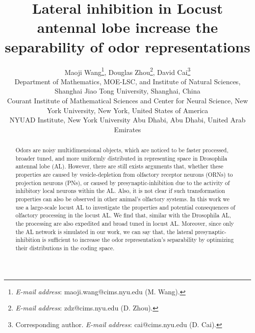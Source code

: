 \documentclass[12pt, a4paper]{article}
\begin{document}
\newcommand{\lr}[1]{\langle #1 \rangle}
\newcommand{\llr}[1]{\langle \hspace{-2.5pt} \langle #1 \rangle \hspace{-2.5pt} \rangle}

\title{Lateral inhibition in Locust antennal lobe increase the separability of odor representations}
\author{ \small %
  Maoji Wang\footnote{\emph{E-mail address}: maoji.wang@cims.nyu.edu (M. Wang).},
  Douglas Zhou\footnote{\emph{E-mail address}: zdz@cims.nyu.edu (D. Zhou).},
  David Cai\footnote{Corresponding author. \emph{E-mail address}: cai@cims.nyu.edu (D. Cai).}
\\{\tiny{
    Department of Mathematics, MOE-LSC, and Institute of Natural Sciences, Shanghai Jiao Tong University, Shanghai, China}} \vspace{-3mm} \\{\tiny{
    Courant Institute of Mathematical Sciences and Center for Neural Science, New York University, New York, United States of America}} \vspace{-3mm} \\{\tiny{
    NYUAD Institute, New York University Abu Dhabi, Abu Dhabi, United Arab Emirates
}} } \date{} \maketitle \vspace{-10mm}

\begin{abstract} \footnotesize
  Odors are noisy multidimensional objects, which are noticed to be faster processed, broader tuned, and more uniformly distributed in representing space in Drosophila antennal lobe (AL). However, there are still exists arguments that, whether these properties are caused by vesicle-depletion from olfactory receptor neurons (ORNs) to projection neurons (PNs), or caused by presynaptic-inhibition due to the activity of inhibitory local neurons within the AL. Also, it is not clear if such transformation properties can also be observed in other animal's olfactory systems. In this work we use a %
  large-scale locust AL %
  to investigate the properties and potential consequences of olfactory processing in the locust AL. We find that, similar with the Drosophila AL, the processing are also expedited and broad tuned in locust AL. Moreover, since only the AL network is simulated in our work, we can say that, the lateral presynaptic-inhibition is sufficient to increase the odor representation's separability by optimizing their distributions in the coding space.
\end{abstract}
\end{document}
